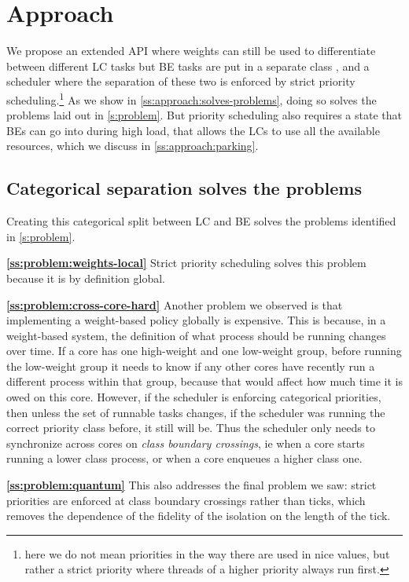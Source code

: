 \section{Approach}\label{s:approach}

We propose an extended \cgroups{} API where weights can still be used to
differentiate between different LC tasks but BE tasks are put in a separate
class \beclass{}, and a scheduler where the separation of these two is enforced
by strict priority scheduling.\footnote{here we do not mean priorities in the
way there are used in nice values, but rather a strict priority where threads of
a higher priority always run first.} As we show in
\autoref{ss:approach:solves-problems}, doing so solves the problems laid out in
\autoref{s:problem}. But priority scheduling also requires a state that BEs can
go into during high load, that allows the LCs to use all the available
resources, which we discuss in \autoref{ss:approach:parking}.

\subsection{Categorical separation solves the
problems}\label{ss:approach:solves-problems}

Creating this categorical split between LC and BE  solves the problems
identified in \autoref{s:problem}.

\textbf{\autoref{ss:problem:weights-local}} Strict priority scheduling solves
this problem because it is by definition global.

\textbf{\autoref{ss:problem:cross-core-hard}} Another problem we observed is
that implementing a weight-based policy globally is expensive. This is because,
in a weight-based system, the definition of what process should be running
changes over time. If a core has one high-weight and one low-weight group,
before running the low-weight group it needs to know if any other cores have
recently run a different process within that group, because that would affect
how much time it is owed on this core. However, if the scheduler is enforcing
categorical priorities, then unless the set of runnable tasks changes, if the
scheduler was running the correct priority class before, it still will be. Thus
the scheduler only needs to synchronize across cores on \textit{class boundary
crossings}, ie when a core starts running a lower class process, or when a core
enqueues a higher class one.

\textbf{\autoref{ss:problem:quantum}} This also addresses the final problem we
saw: strict priorities are enforced at class boundary crossings rather than
ticks, which removes the dependence of the fidelity of the isolation on the
length of the tick.

